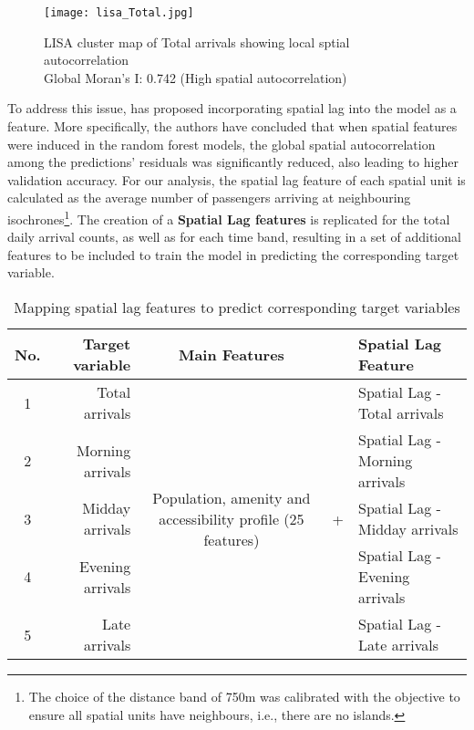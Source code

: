 \begin{figure}[!ht]
    \centering
    \texttt{[image: lisa\_Total.jpg]}
    \captionsetup{justification=centering}
    \caption{LISA cluster map of Total arrivals showing local sptial autocorrelation\\Global Moran's I: 0.742 (High spatial autocorrelation)}
    \label{fig:lisacluster}
\end{figure}

To address this issue, \citet{liuIncorporatingSpatialAutocorrelation2022} has proposed incorporating spatial lag into the model as a feature. More specifically, the authors have concluded that when spatial features were induced in the random forest models, the global spatial autocorrelation among the predictions' residuals was significantly reduced, also leading to higher validation accuracy. For our analysis, the spatial lag feature of each spatial unit is calculated as the average number of passengers arriving at neighbouring isochrones\footnote{The choice of the distance band of 750m was calibrated with the objective to ensure all spatial units have neighbours, i.e., there are no islands.}. The creation of a \textbf{Spatial Lag features} is replicated for the total daily arrival counts, as well as for each time band, resulting in a set of additional features to be included to train the model in predicting the corresponding target variable.

\begin{table}[ht]
    \centering
    \renewcommand{\arraystretch}{1.5}
    \begin{tabular}{|c r || c c l|}
        \hline
        \rowcolor{lightgray}
        \textbf{No.} & \textbf{Target variable} & \textbf{Main Features} & &\textbf{Spatial Lag Feature}\\
        
        \hline
        1 & Total arrivals  &  \multirow{5}{10em}{Population, amenity and accessibility profile (25 features)} 
                                &  \multirow{5}{*}{+}       &   Spatial Lag - Total arrivals    \\ 
        2 & Morning arrivals    &                       &   &   Spatial Lag - Morning arrivals  \\ 
        3 & Midday arrivals     &                       &   &   Spatial Lag - Midday arrivals   \\ 
        4 & Evening arrivals    &                       &   &   Spatial Lag - Evening arrivals  \\ 
        5 & Late arrivals       &                       &   &   Spatial Lag - Late arrivals     \\
        \hline
    \end{tabular}
    \caption{Mapping spatial lag features to predict corresponding target variables}
    \label{tab:spatiallag}
\end{table}



